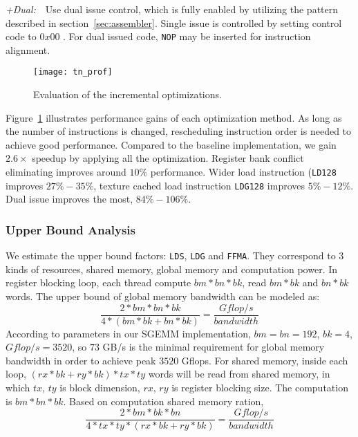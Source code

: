 {\it +Dual:}~~Use dual issue control, which is fully enabled by utilizing the pattern described in section~\ref{sec:assembler}.
Single issue is controlled by setting control code to $0x00$ . 
For dual issued code, {\tt NOP} may be inserted for instruction alignment.

\begin{figure}[htbp]
\begin{center}
\texttt{[image: tn\_prof]}
    \caption{Evaluation of the incremental optimizations.}
\label{fig:th_prof}
\end{center}
\end{figure}

Figure~\ref{fig:th_prof} illustrates performance gains of each optimization method.
As long as the number of instructions is changed, rescheduling instruction order is needed to achieve good performance.
Compared to the baseline implementation, we gain $2.6\times$ speedup by applying all the optimization.
Register bank conflict eliminating improves around $10\%$ performance. 
Wider load instruction ({\tt LD128} improves $27\%-35\%$, texture cached
load instruction {\tt LDG128} improves $5\%-12\%$.
Dual issue improves the most, $84\%-106\%$.

\subsubsection{Upper Bound Analysis}


We estimate the upper bound factors: {\tt LDS}, {\tt LDG} and {\tt FFMA}. They correspond to $3$ kinds of resources, 
shared
memory, global memory and computation power. In register blocking loop, each thread compute $bm*bn*bk$, read $bm*bk$
and $bn*bk$ words. The upper bound of global memory bandwidth can be modeled as:
\begin{displaymath}
    \frac{2*bm*bn*bk}{4*(bm*bk + bn*bk)} = \frac{Gflop/s}{bandwidth}
\end{displaymath}
According to parameters in our SGEMM implementation, $bm=bn=192$, $bk=4$, $Gflop/s=3520$, so $73$ GB/s is the minimal
requirement for global memory bandwidth in order to achieve peak $3520$ Gflops.
For shared memory, inside each loop, $(rx*bk + ry * bk)*tx*ty$ words will be read from shared memory, in which $tx$,
$ty$ is block dimension, $rx$, $ry$ is register blocking size. The computation is $bm*bn*bk$. Based on computation
shared memory ration,
\begin{displaymath}
    \frac{2*bm*bk*bn}{4*tx*ty*(rx*bk + ry *bk)}  = \frac{Gflop/s}{bandwidth}
\end{displaymath}

